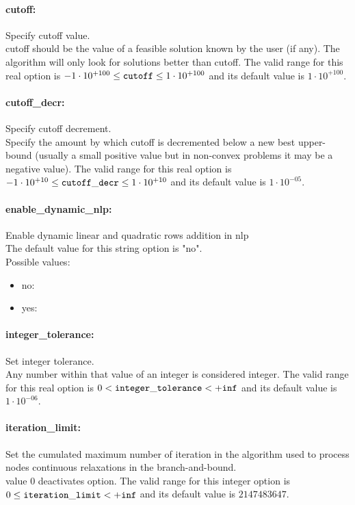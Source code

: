 \paragraph{cutoff:}\label{sec:cutoff} Specify cutoff value. $\;$ \\
 cutoff should be the value of a feasible solution
known by the user (if any). The algorithm will
only look for solutions better than cutoff. The valid range for this real option is 
$-1 \cdot 10^{+100} \le {\tt cutoff } \le 1 \cdot 10^{+100}$
and its default value is $1 \cdot 10^{+100}$.


\paragraph{cutoff\_decr:}\label{sec:cutoff_decr} Specify cutoff decrement. $\;$ \\
 Specify the amount by which cutoff is decremented
below a new best upper-bound (usually a small
positive value but in non-convex problems it may
be a negative value). The valid range for this real option is 
$-1 \cdot 10^{+10} \le {\tt cutoff\_decr } \le 1 \cdot 10^{+10}$
and its default value is $1 \cdot 10^{-05}$.


\paragraph{enable\_dynamic\_nlp:}\label{sec:enable_dynamic_nlp} Enable dynamic linear and quadratic rows addition in nlp $\;$ \\

The default value for this string option is "no".
\\ 
Possible values:
\begin{itemize}
   \item no: 
   \item yes: 
\end{itemize}

\paragraph{integer\_tolerance:}\label{sec:integer_tolerance} Set integer tolerance. $\;$ \\
 Any number within that value of an integer is
considered integer. The valid range for this real option is 
$0 <  {\tt integer\_tolerance } <  {\tt +inf}$
and its default value is $1 \cdot 10^{-06}$.


\paragraph{iteration\_limit:}\label{sec:iteration_limit} Set the cumulated maximum number of iteration in the algorithm used to process nodes continuous relaxations in the branch-and-bound. $\;$ \\
 value 0 deactivates option. The valid range for this integer option is
$0 \le {\tt iteration\_limit } <  {\tt +inf}$
and its default value is $2147483647$.


